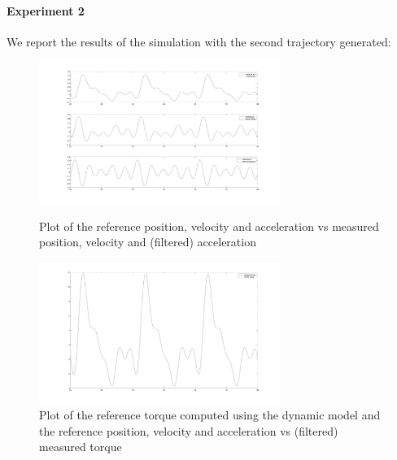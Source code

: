 \documentclass{article}
\begin{document}
\paragraph{Experiment 2}
We report the results of the simulation with the second trajectory generated:
\begin{figure}[!htbp]
\centering
\includegraphics[width=0.7\textwidth]{images/1-dof/new_experiment4_traj.png}
\caption{Plot of the reference position, velocity and acceleration vs measured position, velocity and (filtered) acceleration}
\includegraphics[width=0.7\textwidth]{images/1-dof/new_experiment4.png}
\caption{Plot of the reference torque computed using the dynamic model and the reference position, velocity and acceleration vs (filtered) measured torque}
\end{figure}
\pagebreak
\end{document}
